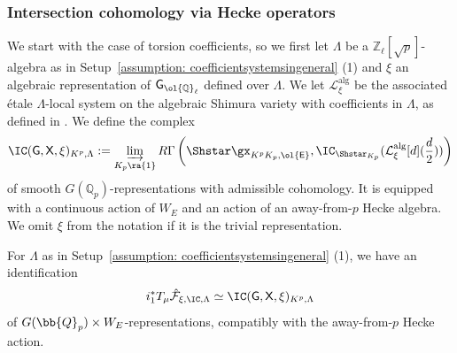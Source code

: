 \documentclass[letterpaper,11pt]{amsart}
\begin{document}
\subsubsection{Intersection cohomology via Hecke operators}
We start with the case of torsion coefficients, so we first let $\Lambda$ be a $\mathbb{Z}_{\ell}[\sqrt{p}]$-algebra as in Setup~\ref{assumption: coefficientsystemsingeneral} (1) and $\xi$ an algebraic representation of $\mathsf{G}_{\ol{\mathbb{Q}}_{\ell}}$ defined over $\Lambda$. We let $\mathcal{L}_{\xi}^{\mathrm{alg}}$ be the associated \'etale $\Lambda$-local system on the algebraic Shimura variety with coefficients in $\Lambda$, as defined in \cite{PinkHigherDirectImages}. We define the complex 
\begin{equation}{\label{eqn: InfiniteLevelIntersectionCohomology}}
\IC(\mathsf{G},\mathsf{X},\xi)_{K^p, \Lambda}:=\varinjlim_{K_{p} \ra \{1\}} R\Gamma\left(\Shstar\gx_{K^pK_p,\ol{\mathsf{E}}},\IC_{\Shstar_{K_{p}}}(\mathcal{L}_{\xi}^{\mathrm{alg}}[d](\frac{d}{2}))\right)
\end{equation}
of smooth $G(\mathbb{Q}_p)$-representations with admissible cohomology. It is equipped with a continuous action of $W_E$ and an action of an away-from-$p$ Hecke algebra. We omit $\xi$ from the notation if it is the trivial representation.


\begin{theorem}\label{thm: Hecke operator torsion}
For $\Lambda$ as in Setup~\ref{assumption: coefficientsystemsingeneral} (1), we have an identification
\[ 
i_{1}^{*}T_{\mu}\hat{\mathcal{F}}_{\xi,\IC,\Lambda} \simeq \IC(\mathsf{G},\mathsf{X},\xi)_{K^p, \Lambda}
\]
of $G(\bb{Q}_{p}) \times W_{E}$-representations, compatibly with the away-from-$p$ Hecke action. 
\end{theorem}
\end{document}
